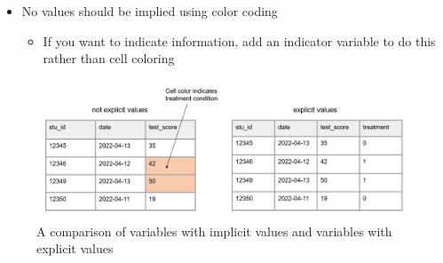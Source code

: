 \documentclass[
]{book}
\providecommand{\tightlist}{%
  \setlength{\itemsep}{0pt}\setlength{\parskip}{0pt}}
\begin{document}
\begin{itemize}
\tightlist
\item
  No values should be implied using color coding

  \begin{itemize}
  \tightlist
  \item
    If you want to indicate information, add an indicator variable to do this rather than cell coloring
  \end{itemize}
\end{itemize}

\begin{figure}

{\centering \includegraphics[width=1\linewidth]{img/cell_color} 

}

\caption{A comparison of variables with implicit values and variables with explicit values}\label{fig:unnamed-chunk-7}
\end{figure}
\end{document}
